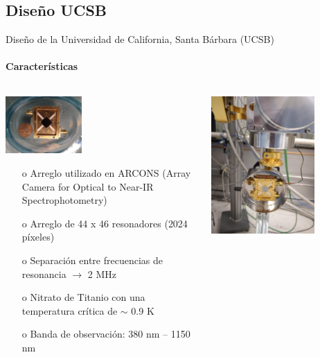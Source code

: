 \documentclass[ignorenonframetext,12pt]{beamer}
\begin{document}
\subsection{Diseño UCSB}
\begin{frame}{Diseño de la Universidad de California, Santa Bárbara (UCSB)}
				\framesubtitle{Características}
				\begin{columns}
								\begin{column}{0.49\textwidth}
												\includegraphics[width=0.4\textwidth]{mkid4}
												\begin{itemize}
																\item[o] Arreglo utilizado en ARCONS (Array
																				Camera for Optical to Near-IR
																				Spectrophotometry)
																\item[o] Arreglo de 44 x 46 resonadores (\alert{2024
																				píxeles})
																\item[o] Separación entre frecuencias de
																				resonancia $\to$ \alert{2 MHz}
																\item[o] Nitrato de Titanio con una temperatura
																				crítica de \alert{$\sim$ 0.9 K}
																\item[o] Banda de observación: \alert{380 nm --
																				1150 nm}
												\end{itemize}
								\end{column}
								\begin{column}{0.49\textwidth}
												\centering
												\includegraphics[angle=-90,width=0.72\textwidth]{mkid2}

\end{column}
\end{columns}
\end{frame}
\end{document}
